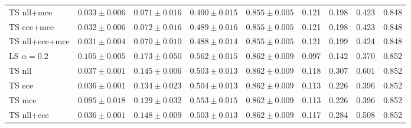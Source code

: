 \begin{table}[h!]
{\begin{tabular}{l|cccc|m{0.8cm}m{0.8cm}m{0.8cm}m{0.8cm}|}
			TS nll+mce & \multicolumn{1}{c|}{$0.033 \pm 0.006$} & \multicolumn{1}{c|}{$0.071 \pm 0.016$} & \multicolumn{1}{c|}{$0.490 \pm 0.015$} & \multicolumn{1}{c|}{$0.855 \pm 0.005$} & \multicolumn{1}{c|}{0.121} & \multicolumn{1}{c|}{0.198} & \multicolumn{1}{c|}{0.423} & \multicolumn{1}{c|}{0.848} \\
			TS ece+mce & \multicolumn{1}{c|}{$0.032 \pm 0.006$} & \multicolumn{1}{c|}{$0.072 \pm 0.016$} & \multicolumn{1}{c|}{$0.489 \pm 0.016$} & \multicolumn{1}{c|}{$0.855 \pm 0.005$} & \multicolumn{1}{c|}{0.121} & \multicolumn{1}{c|}{0.198} & \multicolumn{1}{c|}{0.423} & \multicolumn{1}{c|}{0.848} \\
			TS nll+ece+mce & \multicolumn{1}{c|}{$0.031 \pm 0.004$} & \multicolumn{1}{c|}{$0.070 \pm 0.010$} & \multicolumn{1}{c|}{$0.488 \pm 0.014$} & \multicolumn{1}{c|}{$0.855 \pm 0.005$} & \multicolumn{1}{c|}{0.121} & \multicolumn{1}{c|}{0.199} & \multicolumn{1}{c|}{0.424} & \multicolumn{1}{c|}{0.848} \\ \hline \hline
			LS $\alpha=0.2$ & \multicolumn{1}{c|}{$0.105 \pm 0.005$} & \multicolumn{1}{c|}{$0.173 \pm 0.050$} & \multicolumn{1}{c|}{$0.562 \pm 0.015$} & \multicolumn{1}{c|}{$0.862 \pm 0.009$} & \multicolumn{1}{c|}{0.097} & \multicolumn{1}{c|}{0.142} & \multicolumn{1}{c|}{0.370} & \multicolumn{1}{c|}{0.852} \\
			TS nll & \multicolumn{1}{c|}{$0.037 \pm 0.001$} & \multicolumn{1}{c|}{$0.145 \pm 0.006$} & \multicolumn{1}{c|}{$0.503 \pm 0.013$} & \multicolumn{1}{c|}{$0.862 \pm 0.009$} & \multicolumn{1}{c|}{0.118} & \multicolumn{1}{c|}{0.307} & \multicolumn{1}{c|}{0.601} & \multicolumn{1}{c|}{0.852} \\
			TS ece & \multicolumn{1}{c|}{$0.036 \pm 0.001$} & \multicolumn{1}{c|}{$0.134 \pm 0.023$} & \multicolumn{1}{c|}{$0.504 \pm 0.013$} & \multicolumn{1}{c|}{$0.862 \pm 0.009$} & \multicolumn{1}{c|}{0.113} & \multicolumn{1}{c|}{0.226} & \multicolumn{1}{c|}{0.396} & \multicolumn{1}{c|}{0.852} \\
			TS mce & \multicolumn{1}{c|}{$0.095 \pm 0.018$} & \multicolumn{1}{c|}{$0.129 \pm 0.032$} & \multicolumn{1}{c|}{$0.553 \pm 0.015$} & \multicolumn{1}{c|}{$0.862 \pm 0.009$} & \multicolumn{1}{c|}{0.113} & \multicolumn{1}{c|}{0.226} & \multicolumn{1}{c|}{0.396} & \multicolumn{1}{c|}{0.852} \\
			TS nll+ece & \multicolumn{1}{c|}{$0.036 \pm 0.001$} & \multicolumn{1}{c|}{$0.148 \pm 0.009$} & \multicolumn{1}{c|}{$0.503 \pm 0.013$} & \multicolumn{1}{c|}{$0.862 \pm 0.009$} & \multicolumn{1}{c|}{0.117} & \multicolumn{1}{c|}{0.284} & \multicolumn{1}{c|}{0.508} & \multicolumn{1}{c|}{0.852} \\

\end{tabular}}
\end{table}
